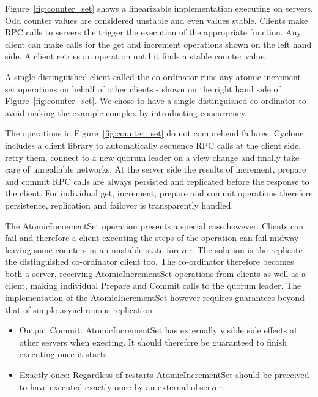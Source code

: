 \documentclass[twocolumn]{article}
\begin{document}
Figure~\ref{fig:counter_set} shows a linearizable implementation executing on
servers. Odd counter values are considered unstable and even values stable.
Clients make RPC calls to servers the trigger the execution of the
appropriate function. Any client can make calls for the get and increment
operations shown on the left hand side. A client retries an operation until it
finds a stable counter value.

A single distinguished client called the co-ordinator runs any atomic increment
set operations on behalf of other clients - shown on the right hand side of
Figure~\ref{fig:counter_set}. We chose to have a single
distinguished co-ordinator to avoid making the example complex by introducting
concurrency.

The operations in Figure~\ref{fig:counter_set} do not comprehend failures.
Cyclone includes a client library to automatically sequence RPC calls at the client
side, retry them, connect to a new quorum leader on a view change and finally
take care of unrealiable networks. At the server side the results of increment,
prepare and commit RPC calls are always persisted and replicated before the
response to the client. For individual get, increment, prepare and commit
operations therefore persistence, replication and failover is transparently
handled.

The AtomicIncrementSet operation presents a special case however. Clients can
fail and therefore a client executing the steps of the operation can fail midway
leaving some counters in an unstable state forever. The solution is the
replicate the distinguished co-ordinator client too. The co-ordinator therefore
becomes both a server, receiving AtomicIncrementSet operations from clients as
well as a client, making individual Prepare and Commit calls to the quorum
leader. The implementation of the AtomicIncrementSet however requires guarantees
beyond that of simple asynchronous replication

\begin{itemize}
  \item Output Commit: AtomicIncrementSet has externally visible side effects at
    other servers when execting. It should therefore be guaranteed to finish
    executing once it starts
  \item Exactly once: Regardless of restarts AtomicIncrementSet should be
    preceived to have executed exactly once by an external observer.
\end{itemize}
\end{document}
